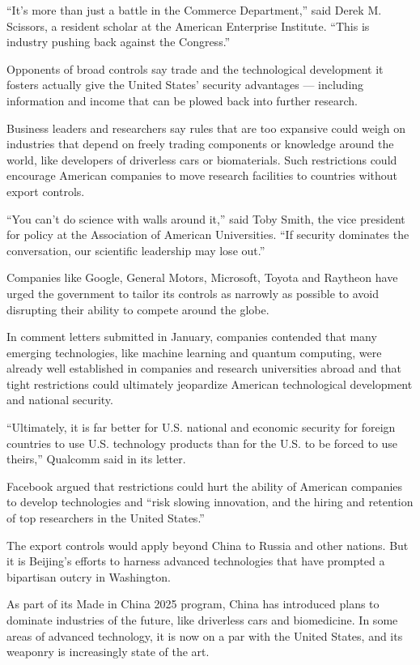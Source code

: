 ``It's more than just a battle in the Commerce Department,'' said Derek
M. Scissors, a resident scholar at the American Enterprise Institute.
``This is industry pushing back against the Congress.''

Opponents of broad controls say trade and the technological development
it fosters actually give the United States' security advantages ---
including information and income that can be plowed back into further
research.

Business leaders and researchers say rules that are too expansive could
weigh on industries that depend on freely trading components or
knowledge around the world, like developers of driverless cars or
biomaterials. Such restrictions could encourage American companies to
move research facilities to countries without export controls.

``You can't do science with walls around it,'' said Toby Smith, the vice
president for policy at the Association of American Universities. ``If
security dominates the conversation, our scientific leadership may lose
out.''

Companies like Google, General Motors, Microsoft, Toyota and Raytheon
have urged the government to tailor its controls as narrowly as possible
to avoid disrupting their ability to compete around the globe.

In comment letters submitted in January, companies contended that many
emerging technologies, like machine learning and quantum computing, were
already well established in companies and research universities abroad
and that tight restrictions could ultimately jeopardize American
technological development and national security.

``Ultimately, it is far better for U.S. national and economic security
for foreign countries to use U.S. technology products than for the U.S.
to be forced to use theirs,'' Qualcomm said in its letter.

Facebook argued that restrictions could hurt the ability of American
companies to develop technologies and ``risk slowing innovation, and the
hiring and retention of top researchers in the United States.''

The export controls would apply beyond China to Russia and other
nations. But it is Beijing's efforts to harness advanced technologies
that have prompted a bipartisan outcry in Washington.

As part of its Made in China 2025 program, China has introduced plans to
dominate industries of the future, like driverless cars and biomedicine.
In some areas of advanced technology, it is now on a par with the United
States, and its weaponry is increasingly state of the art.

